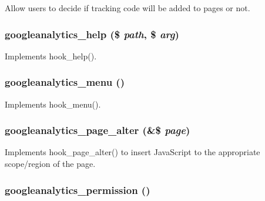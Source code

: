 Allow users to decide if tracking code will be added to pages or not. \hypertarget{googleanalytics_8module_a10055ad1b7bc9042ac16b1b7dace57de}{
\subsubsection[{googleanalytics\_\-help}]{\setlength{\rightskip}{0pt plus 5cm}googleanalytics\_\-help (\$ {\em path}, \/  \$ {\em arg})}}
\label{googleanalytics_8module_a10055ad1b7bc9042ac16b1b7dace57de}
Implements hook\_\-help(). \hypertarget{googleanalytics_8module_a6fa96d968af1105942266ae3e32858be}{
\subsubsection[{googleanalytics\_\-menu}]{\setlength{\rightskip}{0pt plus 5cm}googleanalytics\_\-menu ()}}
\label{googleanalytics_8module_a6fa96d968af1105942266ae3e32858be}
Implements hook\_\-menu(). \hypertarget{googleanalytics_8module_a08280011b658d2c0c1302eab3951f240}{
\subsubsection[{googleanalytics\_\-page\_\-alter}]{\setlength{\rightskip}{0pt plus 5cm}googleanalytics\_\-page\_\-alter (\&\$ {\em page})}}
\label{googleanalytics_8module_a08280011b658d2c0c1302eab3951f240}
Implements hook\_\-page\_\-alter() to insert JavaScript to the appropriate scope/region of the page. \hypertarget{googleanalytics_8module_ae66161f9d90584b809a6a68445ba4da7}{
\subsubsection[{googleanalytics\_\-permission}]{\setlength{\rightskip}{0pt plus 5cm}googleanalytics\_\-permission ()}}
